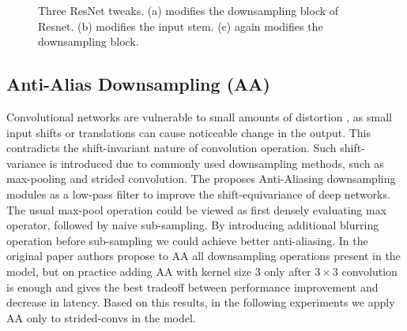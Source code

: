 \begin{figure}[t!]
{  }\hfill%
  \caption{Three ResNet tweaks. (a) modifies the downsampling block of Resnet. (b) modifies the input stem. (c) again modifies the downsampling block.}
  \label{fig:resnet-tweaks}
\end{figure}


\subsection{Anti-Alias Downsampling (AA)}
Convolutional networks are vulnerable to small amounts of distortion \cite{xie2020_adversarial}, as small input shifts or translations can cause noticeable change in the output. This contradicts the shift-invariant nature of convolution operation. Such shift-variance is introduced due to commonly used downsampling methods, such as max-pooling and strided convolution. The \cite{zhang2019_making_aa_shift_invariant} proposes Anti-Aliasing downsampling modules as a low-pass filter to improve the shift-equivariance of deep networks. The usual max-pool operation could be viewed as first densely evaluating max operator, followed by naive sub-sampling. By introducing additional blurring operation before sub-sampling we could achieve better anti-aliasing. In the original paper authors propose to AA all downsampling operations present in the model, but on practice \cite{lee2020_compounding_improvements} adding AA with kernel size 3 only after $3 \times 3 $ convolution is enough and gives the best tradeoff between performance improvement and decrease in latency. Based on this results, in the following experiments we apply AA only to strided-convs in the model. 





